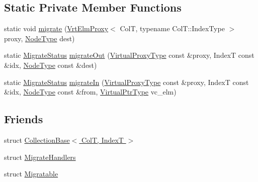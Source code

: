 \subsection*{Static Private Member Functions}
\begin{DoxyCompactItemize}
\item 
static void \hyperlink{structvt_1_1vrt_1_1collection_1_1_collection_elm_attorney_aa7e23dcc55cf4df77445b9795a32f44e}{migrate} (\hyperlink{structvt_1_1vrt_1_1collection_1_1_vrt_elm_proxy}{Vrt\+Elm\+Proxy}$<$ ColT, typename Col\+T\+::\+Index\+Type $>$ proxy, \hyperlink{namespacevt_a866da9d0efc19c0a1ce79e9e492f47e2}{Node\+Type} dest)
\item 
static \hyperlink{namespacevt_1_1vrt_1_1collection_ad221ad8aea9e586689b4335f5bcd9804}{Migrate\+Status} \hyperlink{structvt_1_1vrt_1_1collection_1_1_collection_elm_attorney_a672eb9e913410235692033f5b7ea24b5}{migrate\+Out} (\hyperlink{namespacevt_a1b417dd5d684f045bb58a0ede70045ac}{Virtual\+Proxy\+Type} const \&proxy, IndexT const \&idx, \hyperlink{namespacevt_a866da9d0efc19c0a1ce79e9e492f47e2}{Node\+Type} const \&dest)
\item 
static \hyperlink{namespacevt_1_1vrt_1_1collection_ad221ad8aea9e586689b4335f5bcd9804}{Migrate\+Status} \hyperlink{structvt_1_1vrt_1_1collection_1_1_collection_elm_attorney_ab91ae27fcdf3915977f59aaaebb55b4d}{migrate\+In} (\hyperlink{namespacevt_a1b417dd5d684f045bb58a0ede70045ac}{Virtual\+Proxy\+Type} const \&proxy, IndexT const \&idx, \hyperlink{namespacevt_a866da9d0efc19c0a1ce79e9e492f47e2}{Node\+Type} const \&from, \hyperlink{structvt_1_1vrt_1_1collection_1_1_collection_elm_attorney_a36fe2c7f590baec1038c592db59a6315}{Virtual\+Ptr\+Type} vc\+\_\+elm)
\end{DoxyCompactItemize}
\subsection*{Friends}
\begin{DoxyCompactItemize}
\item 
struct \hyperlink{structvt_1_1vrt_1_1collection_1_1_collection_elm_attorney_a4fb39ed9be2f0de84b237088ececde3f}{Collection\+Base$<$ Col\+T, Index\+T $>$}
\item 
struct \hyperlink{structvt_1_1vrt_1_1collection_1_1_collection_elm_attorney_af2ee449d95081faa04ebc6b8ae6516ed}{Migrate\+Handlers}
\item 
struct \hyperlink{structvt_1_1vrt_1_1collection_1_1_collection_elm_attorney_a5137563a7cb738979426be13c3089839}{Migratable}
\end{DoxyCompactItemize}


